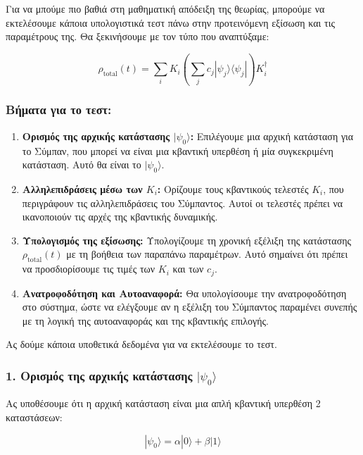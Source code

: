\documentclass[a4paper,11pt]{article}
\begin{document}
{}
Για να μπούμε πιο βαθιά στη μαθηματική απόδειξη της θεωρίας, μπορούμε να
εκτελέσουμε κάποια υπολογιστικά τεστ πάνω στην προτεινόμενη εξίσωση και
τις παραμέτρους της. Θα ξεκινήσουμε με τον τύπο που αναπτύξαμε:

{{{\[\rho_{\text{total}}(t) = \sum_i K_i \left( \sum_j c_j |\psi_j \rangle \langle \psi_j | \right) K_i^\dagger\]}}}

\subsubsection{Βήματα για το
τεστ:}\label{ux3b2ux3aeux3bcux3b1ux3c4ux3b1-ux3b3ux3b9ux3b1-ux3c4ux3bf-ux3c4ux3b5ux3c3ux3c4}

\begin{enumerate}
\item
  \textbf{Ορισμός της αρχικής κατάστασης {{\(|\psi_0\rangle\)}}:}
  Επιλέγουμε μια αρχική κατάσταση για το Σύμπαν, που μπορεί να είναι μια
  κβαντική υπερθέση ή μία συγκεκριμένη κατάσταση. Αυτό θα είναι το
  {{\(|\psi_0\rangle\)}}.
\item
  \textbf{Αλληλεπιδράσεις μέσω των {{\(K_i\)}}:} Ορίζουμε τους
  κβαντικούς τελεστές {{\(K_i\)}}, που περιγράφουν τις αλληλεπιδράσεις
  του Σύμπαντος. Αυτοί οι τελεστές πρέπει να ικανοποιούν τις αρχές της
  κβαντικής δυναμικής.
\item
  \textbf{Υπολογισμός της εξίσωσης:} Υπολογίζουμε τη χρονική εξέλιξη της
  κατάστασης {{\(\rho_{\text{total}}(t)\)}} με τη βοήθεια των παραπάνω
  παραμέτρων. Αυτό σημαίνει ότι πρέπει να προσδιορίσουμε τις τιμές των
  {{\(K_i\)}} και των {{\(c_j\)}}.
\item
  \textbf{Ανατροφοδότηση και Αυτοαναφορά:} Θα υπολογίσουμε την
  ανατροφοδότηση στο σύστημα, ώστε να ελέγξουμε αν η εξέλιξη του
  Σύμπαντος παραμένει συνεπής με τη λογική της αυτοαναφοράς και της
  κβαντικής επιλογής.
\end{enumerate}

Ας δούμε κάποια υποθετικά δεδομένα για να εκτελέσουμε το τεστ.

\subsubsection{1. Ορισμός της αρχικής κατάστασης \( |\psi_0\rangle \)}\label{ορισμός-της-αρχικής-κατάστασης-psi_0rangle}




Ας υποθέσουμε ότι η αρχική κατάσταση είναι μια απλή κβαντική υπερθέση 2
καταστάσεων:

{{{\[|\psi_0\rangle = \alpha |0\rangle + \beta |1\rangle\]}}}
\end{document}
